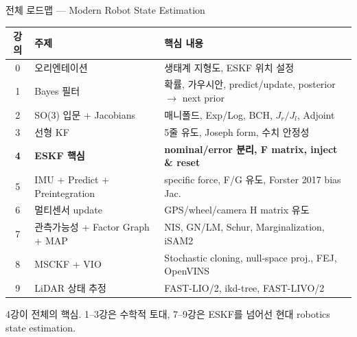 \begin{frame}[shrink=10]{전체 로드맵 — Modern Robot State Estimation}
  \begin{center}
  \footnotesize
  \begin{tabular}{cll}
    \toprule
    강의 & 주제 & 핵심 내용 \\
    \midrule
    0 & 오리엔테이션 & 생태계 지형도, ESKF 위치 설정 \\
    1 & Bayes 필터   & 확률, 가우시안, predict/update, posterior $\to$ next prior \\
    2 & SO(3) 입문 + Jacobians & 매니폴드, Exp/Log, BCH, $J_r/J_l$, Adjoint \\
    3 & 선형 KF      & 5줄 유도, Joseph form, 수치 안정성 \\
    \midrule
    \textbf{4} & \textbf{ESKF 핵심} & \textbf{nominal/error 분리, F matrix, inject \& reset} \\
    5 & IMU + Predict + Preintegration & specific force, F/G 유도, Forster 2017 bias Jac. \\
    6 & 멀티센서 update & GPS/wheel/camera H matrix 유도 \\
    \midrule
    7 & 관측가능성 + Factor Graph + MAP & NIS, GN/LM, Schur, Marginalization, iSAM2 \\
    8 & MSCKF + VIO    & Stochastic cloning, null-space proj., FEJ, OpenVINS \\
    9 & LiDAR 상태 추정 & FAST-LIO/2, ikd-tree, FAST-LIVO/2 \\
    \bottomrule
  \end{tabular}
  \end{center}
  \vspace{0.3em}
  \footnotesize 4강이 전체의 핵심. 1--3강은 수학적 토대, 7--9강은 ESKF를 넘어선 현대 robotics state estimation.
\end{frame}

